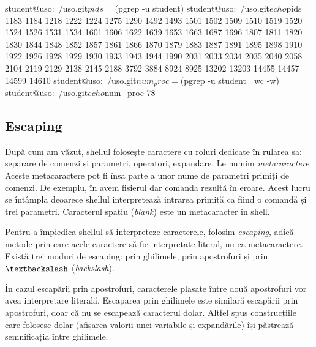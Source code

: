 \begin{screen}[caption={Expandarea comenzilor},label={lst:cli:comm-expansion}]
student@uso:~/uso.git$ pids=$(pgrep -u student)
student@uso:~/uso.git$ echo $pids
1183 1184 1218 1222 1224 1275 1290 1492 1493 1501 1502 1509 1510 1519 1520 1524 1526 1531 1534 1601 1606 1622 1639 1653 1663 1687 1696 1807 1811 1820 1830 1844 1848 1852 1857 1861 1866 1870 1879 1883 1887 1891 1895 1898 1910 1922 1926 1928 1929 1930 1933 1943 1944 1990 2031 2033 2034 2035 2040 2058 2104 2119 2129 2138 2145 2188 3792 3884 8924 8925 13202 13203 14455 14457 14599 14610
student@uso:~/uso.git$ num_proc=$(pgrep -u student | wc -w)
student@uso:~/uso.git$ echo $num_proc
78
\end{screen}

\subsection{Escaping}
\label{sec:cli:shell-func:escaping}

După cum am văzut, shellul folosește caractere cu roluri dedicate în rularea sa:
separare de comenzi și parametri, operatori, expandare. Le numim \textit{metacaractere}. Aceste metacaractere pot
fi însă parte a unor nume de parametri primiți de comenzi. De exemplu, în  avem
fișierul  dar comanda rezultă în eroare. Acest lucru se întâmplă deoarece shellul interpretează intrarea primită ca fiind o comandă și trei parametri. Caracterul spațiu (\textit{blank}) este un metacaracter în shell.


Pentru a împiedica shellul să interpreteze caracterele, folosim \textit{escaping}, adică metode prin care acele caractere să fie interpretate literal, nu ca metacaractere.
Există trei moduri de escaping: prin ghilimele, prin apostrofuri și prin \texttt{$\textbackslash$} (\textit{backslash}).

În cazul escapării prin apostrofuri, caracterele plasate între două apostrofuri
vor avea interpretare literală. Escaparea prin ghilimele este similară escapării
prin apostrofuri, doar că nu se escapează caracterul dolar. Altfel spus
construcțiile care folosesc dolar (afișarea valorii unei variabile și
expandările) își păstrează semnificația între ghilimele.

